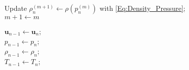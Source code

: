 \begin{algorithm}[htbp]
{{{					Update $ \rho_n^{\left( m+1\right) } \leftarrow \rho(p_n^{\left( m\right) })$ with \eqref{Eq:Density_Pressure};\\
					
					$m+1 \leftarrow m$
				}
			}
		
		$\bm{u}_{n-1} \leftarrow \bm{u}_n$;\\ 
		$p_{n-1} \leftarrow p_n$;\\ 
		$\rho_{n-1} \leftarrow \rho_n$;\\ 
		$T_{n-1} \leftarrow T_n$;\\ 
	}
	
\end{algorithm}

%
%

